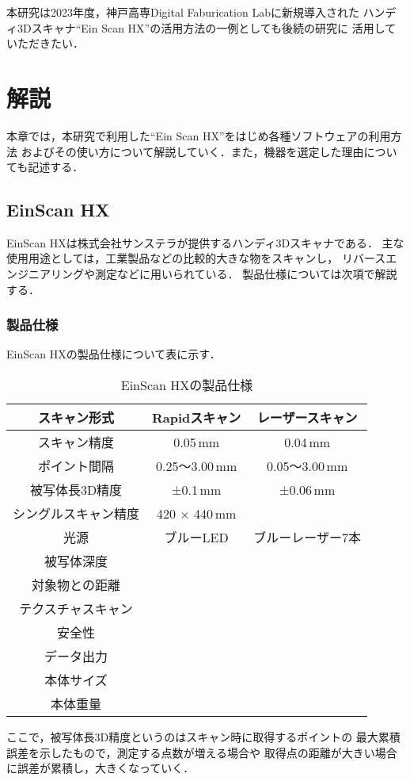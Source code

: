 \documentclass{ltjsreport}
\begin{document}
	本研究は2023年度，神戸高専Digital Faburication Labに新規導入された
	ハンディ3Dスキャナ``Ein Scan HX''\cite{ref:5}の活用方法の一例としても後続の研究に
	活用していただきたい．

\chapter{解説}
	本章では，本研究で利用した``Ein Scan HX''をはじめ各種ソフトウェアの利用方法
	およびその使い方について解説していく．また，機器を選定した理由についても記述する．

	\section{EinScan HX}
		EinScan HXは株式会社サンステラが提供するハンディ3Dスキャナである．
		主な使用用途としては，工業製品などの比較的大きな物をスキャンし，
		リバースエンジニアリングや測定などに用いられている．
		製品仕様については次項で解説する．

		\subsection{製品仕様}
			EinScan HXの製品仕様について表に示す．
			\begin{table}[H]
			\begin{center}
			\caption{EinScan HXの製品仕様}
			\label{tab:EinScan}
			\begin{tabular}{c|cc} \toprule
				スキャン形式&Rapidスキャン&レーザースキャン\\ \hline
				スキャン精度&0.05\,mm&0.04\,mm\\
				ポイント間隔&0.25～3.00\,mm&0.05～3.00\,mm\\
				被写体長3D精度&±0.1\,mm&±0.06\,mm\\
				シングルスキャン精度&420 × 440\,mm&\\
				光源&ブルーLED&ブルーレーザー7本\\
				被写体深度&&\\
				対象物との距離&&\\
				テクスチャスキャン&&\\
				安全性&&\\
				データ出力&&\\
				本体サイズ&&\\
				本体重量&&\\
				\bottomrule
			\end{tabular}
			\end{center}
			\end{table}
			ここで，被写体長3D精度というのはスキャン時に取得するポイントの
			最大累積誤差を示したもので，測定する点数が増える場合や
			取得点の距離が大きい場合に誤差が累積し，大きくなっていく．
\end{document}
